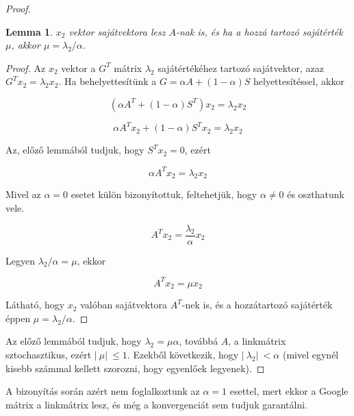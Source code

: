 \documentclass[12pt,a4paper]{article}
\newtheorem{lemma}{Lemma}
\begin{document}
\begin{proof}
	\begin{lemma}
		$x_2$ vektor sajátvektora lesz $A$-nak is, és ha a hozzá tartozó sajátérték $\mu$, akkor $\mu = \lambda_2 / \alpha$. 
	\end{lemma}
    \begin{proof}
    	Az $x_2$ vektor a $G^T$ mátrix $\lambda_2$ sajátértékéhez tartozó sajátvektor, azaz $G^T x_2 = \lambda_2 x_2$. Ha behelyettesítünk a $G = \alpha A + (1-\alpha)S$ helyettesítéssel, akkor
    	
    	\[ (\alpha A^T + (1-\alpha) S^T ) x_2 = \lambda_2 x_2 \]
    	
    	\[ \alpha A^T x_2 + (1-\alpha) S^T x_2 = \lambda_2 x_2 \]
    	 
    	Az, előző lemmából tudjuk, hogy $S^T x_2 = 0$, ezért 
    	
    	\[ \alpha A^T x_2 = \lambda_2 x_2 \]
    	
    	Mivel az $\alpha = 0$ esetet külön bizonyítottuk, feltehetjük, hogy $\alpha \neq 0$ és oszthatunk vele.
    	
    	\[ A^T x_2 = \frac{\lambda_2}{\alpha} x_2 \]
    	 
    	Legyen $\lambda_2/\alpha = \mu$, ekkor
    	 
    	\[ A^T x_2 = \mu x_2 \]
    	
    	Látható, hogy $x_2$ valóban sajátvektora $A^T$-nek is, és a hozzátartozó sajátérték éppen $\mu = \lambda_2/\alpha$.
    	\phantom\qedhere
    \end{proof}
	
	Az előző lemmából tudjuk, hogy $\lambda_2 = \mu \alpha$, továbbá $A$, a linkmátrix sztochasztikus, ezért $|\ \mu |\ \leq 1$. Ezekből következik, hogy $ |\ \lambda_2 |\ < \alpha $ (mivel egynél kisebb számmal kellett szorozni, hogy egyenlőek legyenek).
\end{proof}

A bizonyítás során azért nem foglalkoztunk az $\alpha = 1$ esettel, mert ekkor a Google mátrix a linkmátrix lesz, és még a konvergenciát sem tudjuk garantálni.
\end{document}
